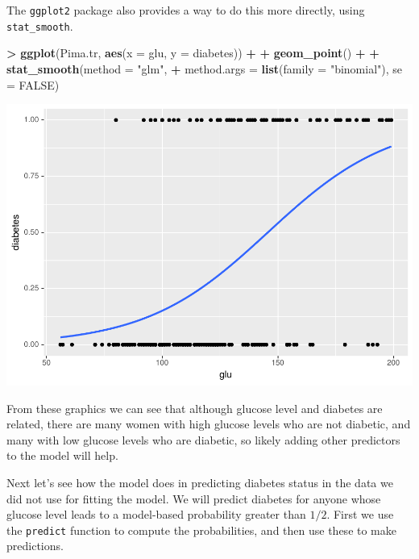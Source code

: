 \documentclass[
]{krantz}
\makeatletter
\newenvironment{Shaded}{\begin{snugshade}}{\end{snugshade}}
\newcommand{\DataTypeTok}[1]{\textcolor[rgb]{0.27,0.27,0.27}{#1}}
\newcommand{\KeywordTok}[1]{\textcolor[rgb]{0.27,0.27,0.27}{\textbf{#1}}}
\newcommand{\NormalTok}[1]{#1}
\newcommand{\OperatorTok}[1]{\textcolor[rgb]{0.43,0.43,0.43}{\textbf{#1}}}
\newcommand{\OtherTok}[1]{\textcolor[rgb]{0.37,0.37,0.37}{#1}}
\newcommand{\StringTok}[1]{\textcolor[rgb]{0.5,0.5,0.5}{#1}}
\newenvironment{kframe}{%
\medskip{}
\setlength{\fboxsep}{.8em}
 \def\at@end@of@kframe{}%
 \ifinner\ifhmode%
  \def\at@end@of@kframe{\end{minipage}}%
  \begin{minipage}{\columnwidth}%
 \fi\fi%
 \def\FrameCommand##1{\hskip\@totalleftmargin \hskip-\fboxsep
 \colorbox{shadecolor}{##1}\hskip-\fboxsep
     \hskip-\linewidth \hskip-\@totalleftmargin \hskip\columnwidth}%
 \MakeFramed {\advance\hsize-\width
   \@totalleftmargin\z@ \linewidth\hsize
   \@setminipage}}%
 {\par\unskip\endMakeFramed%
 \at@end@of@kframe}
\renewenvironment{Shaded}{\begin{kframe}}{\end{kframe}}
\makeatother
\begin{document}
The \texttt{ggplot2} package also provides a way to do this more directly, using \texttt{stat\_smooth}.

\begin{Shaded}
\begin{Highlighting}[]
\OperatorTok{\textgreater{}}\StringTok{ }\KeywordTok{ggplot}\NormalTok{(Pima.tr, }\KeywordTok{aes}\NormalTok{(}\DataTypeTok{x =}\NormalTok{ glu, }\DataTypeTok{y =}\NormalTok{ diabetes)) }\OperatorTok{+}\StringTok{ }
\OperatorTok{+}\StringTok{   }\KeywordTok{geom\_point}\NormalTok{() }\OperatorTok{+}\StringTok{ }
\OperatorTok{+}\StringTok{   }\KeywordTok{stat\_smooth}\NormalTok{(}\DataTypeTok{method =} \StringTok{"glm"}\NormalTok{, }
\OperatorTok{+}\StringTok{               }\DataTypeTok{method.args =} \KeywordTok{list}\NormalTok{(}\DataTypeTok{family =} \StringTok{"binomial"}\NormalTok{), }\DataTypeTok{se =} \OtherTok{FALSE}\NormalTok{)}
\end{Highlighting}
\end{Shaded}

\includegraphics{bookdown_files/figure-latex/unnamed-chunk-240-1.pdf}

From these graphics we can see that although glucose level and diabetes are related, there are many women with high glucose levels who are not diabetic, and many with low glucose levels who are diabetic, so likely adding other predictors to the model will help.

Next let's see how the model does in predicting diabetes status in the data we did not use for fitting the model. We will predict diabetes for anyone whose glucose level leads to a model-based probability greater than \(1/2\). First we use the \texttt{predict} function to compute the probabilities, and then use these to make predictions.
\end{document}
